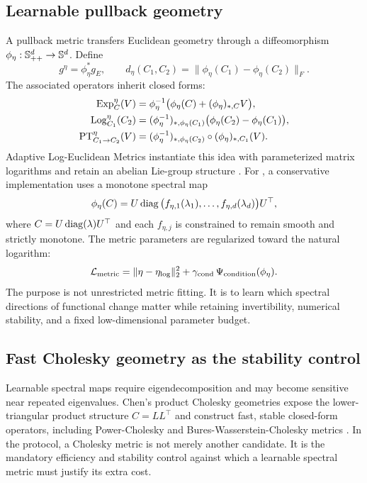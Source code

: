\subsection{Learnable pullback geometry}
A pullback metric transfers Euclidean geometry through a diffeomorphism $\phi_\eta:\mathbb{S}_{++}^d\rightarrow\mathbb{S}^d$. Define
\begin{equation}
  g^{\eta}=\phi_\eta^* g_E,
  \qquad
  d_{\eta}(C_1,C_2)
  = \|\phi_\eta(C_1)-\phi_\eta(C_2)\|_F.
  \label{eq:pullback}
\end{equation}
The associated operators inherit closed forms:
\begin{align}
  \operatorname{Exp}^{\eta}_{C}(V)
  &= \phi_\eta^{-1}\big(\phi_\eta(C)+(\phi_\eta)_{*,C}V\big),\\
  \operatorname{Log}^{\eta}_{C_1}(C_2)
  &= (\phi_\eta^{-1})_{*,\phi_\eta(C_1)}
     \big(\phi_\eta(C_2)-\phi_\eta(C_1)\big),\\
  \operatorname{PT}^{\eta}_{C_1\to C_2}(V)
  &= (\phi_\eta^{-1})_{*,\phi_\eta(C_2)}
     \circ (\phi_\eta)_{*,C_1}(V).
  \label{eq:pullback-ops}
\end{align}
Adaptive Log-Euclidean Metrics instantiate this idea with parameterized matrix logarithms and retain an abelian Lie-group structure \citep{chen2024alem,chen2026thesis}. For \MMALS{}, a conservative implementation uses a monotone spectral map
\begin{equation}
  \phi_\eta(C)
  = U\operatorname{diag}\big(f_{\eta,1}(\lambda_1),\ldots,f_{\eta,d}(\lambda_d)\big)U^\top,
  \label{eq:spectral-map}
\end{equation}
where $C=U\operatorname{diag}(\lambda)U^\top$ and each $f_{\eta,j}$ is constrained to remain smooth and strictly monotone. The metric parameters are regularized toward the natural logarithm:
\begin{equation}
  \mathcal{L}_{\mathrm{metric}}
  = \|\eta-\eta_{\log}\|_2^2
  + \gamma_{\mathrm{cond}}\,\Psi_{\mathrm{condition}}(\phi_\eta).
  \label{eq:metric-reg}
\end{equation}
The purpose is not unrestricted metric fitting. It is to learn which spectral directions of functional change matter while retaining invertibility, numerical stability, and a fixed low-dimensional parameter budget.

\subsection{Fast Cholesky geometry as the stability control}
Learnable spectral maps require eigendecomposition and may become sensitive near repeated eigenvalues. Chen's product Cholesky geometries expose the lower-triangular product structure $C=LL^\top$ and construct fast, stable closed-form operators, including Power-Cholesky and Bures-Wasserstein-Cholesky metrics \citep{chen2026cholesky,chen2026thesis}. In the \MMALS{} protocol, a Cholesky metric is not merely another candidate. It is the mandatory efficiency and stability control against which a learnable spectral metric must justify its extra cost.

